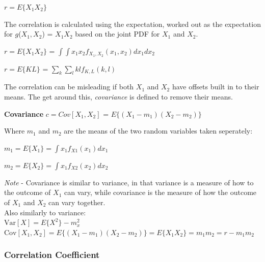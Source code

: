 \documentclass[11pt]{article}
\begin{document}
\begin{center}
    $r = E\{X_1X_2\}$
\end{center}

The correlation is calculated using the expectation, worked out as the expectation for $g$($X_1,X_2$) = $X_1X_2$ based on the joint PDF for $X_1$ and $X_2$.

\begin{center}
    $r = E\{X_1X_2\}$ = $\int \int x_1x_2f_{X_1,X_2}(x_1,x_2)dx_1dx_2$
\end{center}

\begin{center}
   $r = E\{KL\}$ = $\sum\limits_k \sum\limits_l klf_{K,L}(k,l)$
\end{center}

The correlation can be misleading if both $X_1$ and $X_2$ have offsets built in to their means. The get around this, \textit{covariance} is defined to remove their means. \\

\begin{center}
    \textbf{Covariance} $c = Cov[X_1,X_2]$ = $E\{(X_1 - m_1)(X_2 - m_2)\}$
\end{center}

Where $m_1$ and $m_2$ are the means of the two random variables taken seperately:

\begin{center}
    $m_1 = E\{X_1\} = \int x_1f_{X1}(x_1)dx_1$
\end{center}

\begin{center}
    $m_2 = E\{X_2\} = \int x_1f_{X2}(x_2)dx_2$
\end{center}

\textit{Note} - Covariance is similar to variance, in that variance is a measure of how to the outcome of $X_1$ can vary, while covariance is the measure of how the outcome of $X_1$ and $X_2$ can vary together. \\

Also similarly to variance: \\

$\text{Var}[X] = E\{X^2\} - m^2_x$ \\
$\text{Cov}[X_1,X_2] = E\{(X_1-m_1)(X_2-m_2)\} = E\{X_1X_2\} = m_1m_2 = r - m_1m_2$ \\

\subsubsection{Correlation Coefficient}
\end{document}
